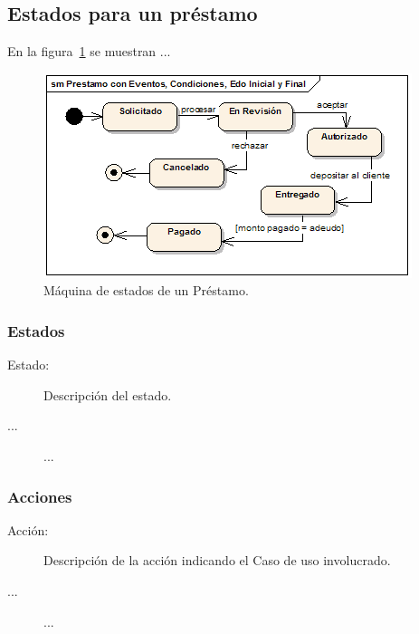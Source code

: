 

\subsection{Estados para un préstamo}

En la figura~\ref{fig:edos-prestamo} se muestran ...

\begin{figure}[htbp]
	\begin{center}
		\includegraphics[width=.7\textwidth]{images/edoPrestamo}
		\caption{Máquina de estados de un Préstamo.}
		\label{fig:edos-prestamo}
	\end{center}
\end{figure}

\subsubsection{Estados}

\begin{description}
	\item[Estado:] Descripción del estado.
	\item[...] ...
\end{description}


\subsubsection{Acciones}

\begin{description}
	\item[Acción:] Descripción de la acción indicando el Caso de uso involucrado.
	\item[...] ...
\end{description}
